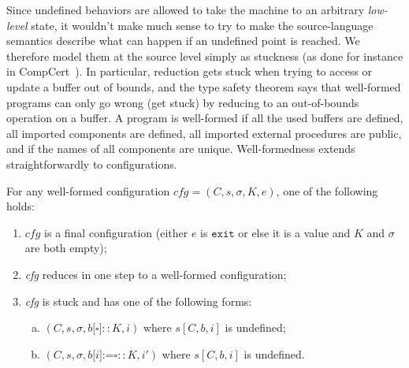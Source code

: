\documentclass[10pt, conference, compsocconf, letterpaper, times]{IEEEtran}
\begin{document}
Since undefined behaviors are allowed to
take the machine to an arbitrary {\em low-level} state, 
it wouldn't make much sense to try to make the source-language semantics
describe what can happen if an undefined point is reached.  
We therefore model them at the source level simply as
stuckness (as done for instance in CompCert~\cite{Leroy09}).
In particular, reduction gets stuck when trying to
access or update a buffer out of bounds, and 
the type safety theorem says
that well-formed programs can only go wrong (get stuck) by reducing to an
out-of-bounds operation on a buffer.
A program is well-formed if all the used buffers are defined, all
imported components are defined, all imported external procedures are
public, and if the names of all components are unique.
Well-formedness extends straightforwardly to configurations.
\ifsooner
{}
\fi

\begin{thm}\Coqed
\label{thm:partial-type-safety}
For any well-formed configuration $\textit{cfg} = (C, s, \sigma, K, e)$,
one of the following holds:
\begin{enumerate}[(1)]
\item $\textit{cfg}$ is a final configuration (either
$e$ is  
$\texttt{exit}$ or else it is a value and $K$ and $\sigma$ are both
empty);
\item \textit{cfg} reduces in one step to a well-formed configuration;
\item \textit{cfg} is stuck and has one of the following forms:
 \begin{enumerate}[(a)]
   \item $(C, s, \sigma, b\texttt{[}\square\texttt{]} :: K, i)$
   where $s[C,b,i]$ is undefined;
   \item $(C, s, \sigma, b\texttt{[}i\texttt{]:=}\square {::} K, i')$ where
   $s[C,b,i]$ is undefined.
 \end{enumerate}
\end{enumerate}
\end{thm}
\end{document}
